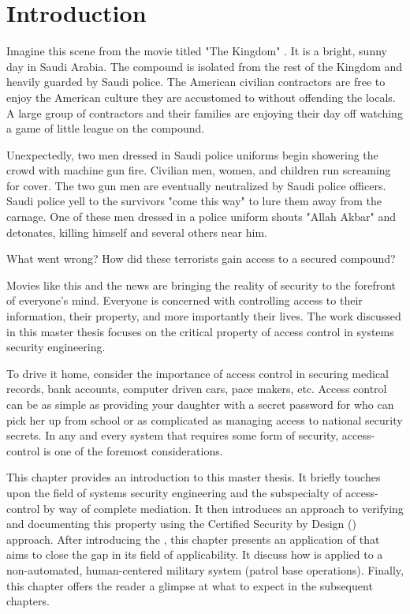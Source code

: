 \documentclass[../../main/main.tex]{subfiles}
\begin{document}
\glsresetall

\chapter{Introduction}
 Imagine this scene from the movie titled "The Kingdom" \cite{kingdom}.  It is a bright, sunny day in Saudi Arabia.  The compound is isolated from the rest of the Kingdom and heavily guarded by Saudi police.  The American civilian contractors are free to enjoy the American culture they are accustomed to without offending the locals.  A large group of contractors and their families are enjoying their day off watching a game of little league on the compound.  
 
 
Unexpectedly, two men dressed in Saudi police uniforms begin showering the crowd with machine gun fire.   Civilian men, women, and children run screaming for cover. The two gun men are eventually neutralized by Saudi police officers.  Saudi police yell to the survivors "come this way" to lure them away from the carnage. One of these men dressed in a police uniform shouts "Allah Akbar" and detonates, killing himself and several others near him. 

What went wrong?  How did these terrorists gain access to a secured compound?  

Movies like this and the news are bringing the reality of security to the forefront of everyone's mind.   Everyone is concerned with controlling access to their information, their property, and more importantly their lives.   The work discussed in this master thesis focuses on the critical property of access control in systems security engineering.

To drive it home, consider the importance of access control in securing medical records, bank accounts, computer driven cars, pace makers, etc.  Access control can be as simple as providing your daughter with a secret password for who can pick her up from school or as complicated as managing access to national security secrets.  In any and every system that requires some form of security, access-control is one of the foremost considerations.

This chapter provides an introduction to this master thesis.  It briefly touches upon the field of systems security engineering and the subspecialty of access-control by way of complete mediation.  It then introduces an approach to verifying and documenting this property using the Certified Security by Design () approach.  After introducing the , this chapter presents an application of  that aims to close the gap in its field of applicability.  It discuss how  is applied to a non-automated, human-centered military system (patrol base operations).  Finally, this chapter offers the reader a glimpse at what to expect in the subsequent chapters.
\end{document}
